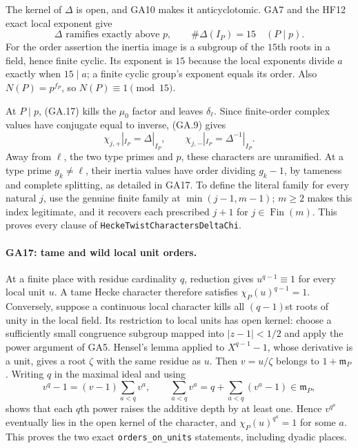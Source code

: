 The kernel of $\Delta$ is open, and GA10 makes it
anticyclotomic. GA7 and the HF12 exact local exponent
give
\[
 \Delta\text{ ramifies exactly above }p,\qquad
 \#\Delta(I_P)=15\quad(P\mid p).                        \tag{GA.21}
\]
For the order assertion the inertia image is a subgroup
of the $15$th roots in a field, hence finite cyclic.
Its exponent is $15$ because the local exponents divide
$a$ exactly when $15\mid a$; a finite cyclic group's
exponent equals its order. Also $N(P)=p^{f_P}$, so
$N(P)\equiv1\pmod{15}$.

At $P\mid p$, (GA.17) kills the $\mu_0$ factor and
leaves $\delta_\ell$. Since finite-order complex values
have conjugate equal to inverse, (GA.9) gives
\[
 \chi_{j,+}|_{I_P}=\Delta|_{I_P},\qquad
 \chi_{j,-}|_{I_P}=\Delta^{-1}|_{I_P}.                   \tag{GA.22}
\]
Away from $\ell$, the two type primes and $p$, these
characters are unramified. At a type prime $g_k\ne\ell$,
their inertia values have order dividing $g_k-1$, by
tameness and complete splitting, as detailed in GA17.
To define the literal family for every natural $j$,
use the genuine finite family at
$\min(j-1,m-1)$; $m\geq2$ makes this index legitimate,
and it recovers each prescribed $j+1$ for $j\in\operatorname{Fin}(m)$.
This proves every clause of
\texttt{HeckeTwistCharactersDeltaChi}.

\paragraph{GA17: tame and wild local unit orders.}
At a finite place with residue cardinality $q$, reduction
gives $u^{q-1}\equiv1$ for every local unit $u$.
A tame Hecke character therefore satisfies
$\chi_P(u)^{q-1}=1$.
Conversely, suppose a continuous local character kills
all $(q-1)$st roots of unity in the local field.
Its restriction to local units has open kernel: choose
a sufficiently small congruence subgroup mapped into
$|z-1|<1/2$ and apply the power argument of GA5.
Hensel's lemma applied to $X^{q-1}-1$, whose derivative
is a unit, gives a root $\zeta$ with the same residue as
$u$. Then $v=u/\zeta$ belongs to $1+\mathfrak m_P$.
Writing $q$ in the maximal ideal and using
\[
 v^q-1=(v-1)\sum_{a<q}v^a,\qquad
 \sum_{a<q}v^a=q+\sum_{a<q}(v^a-1)
 \in\mathfrak m_P,
\]
shows that each $q$th power raises the additive depth
by at least one. Hence $v^{q^a}$ eventually lies in
the open kernel of the character, and
$\chi_P(u)^{q^a}=1$ for some $a$.
This proves the two exact \texttt{orders\_on\_units}
statements, including dyadic places.

